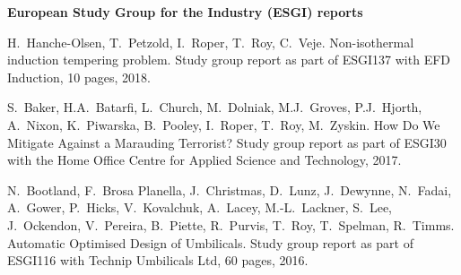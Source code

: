 \documentclass[11pt,a4paper,roman]{moderncv} %
\begin{document}
\vspace{0.5em}

\textbf{European Study Group for the Industry (ESGI) reports}

H.~Hanche-Olsen, T.~Petzold, I.~Roper, T.~Roy, C.~Veje.
\newblock Non-isothermal induction tempering problem.
\newblock Study group report as part of ESGI137 with EFD Induction, 10 pages, 2018.

\vspace{0.5em}

S.~Baker, H.A.~Batarfi, L.~Church, M.~Dolniak, M.J.~Groves, P.J.~Hjorth, A.~Nixon, K.~Piwarska, B.~Pooley, I.~Roper, T.~Roy, M.~Zyskin.
\newblock How Do We Mitigate Against a Marauding Terrorist?
\newblock Study group report as part of ESGI30 with the Home Office Centre for Applied Science and Technology, 2017.

\vspace{0.5em}

N.~Bootland, F.~Brosa Planella, J.~Christmas, D.~Lunz, J.~Dewynne, N.~Fadai, A.~Gower, P.~Hicks, V.~Kovalchuk, A.~Lacey, M.-L.~Lackner, S.~Lee, J.~Ockendon, V.~Pereira, B.~Piette, R.~Purvis, T.~Roy, T.~Spelman, R.~Timms.
\newblock Automatic Optimised Design of Umbilicals.
\newblock Study group report as part of ESGI116 with Technip Umbilicals Ltd, 60 pages, 2016.


% 
% 



\end{document}
